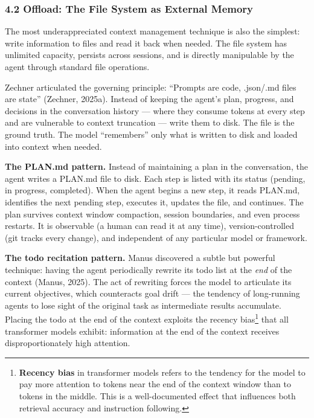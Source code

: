 \documentclass[11pt, a4paper]{article}
\begin{document}
\hypertarget{offload-the-file-system-as-external-memory}{%
\subsubsection{4.2 Offload: The File System as External
Memory}\label{offload-the-file-system-as-external-memory}}

The most underappreciated context management technique is also the
simplest: write information to files and read it back when needed. The
file system has unlimited capacity, persists across sessions, and is
directly manipulable by the agent through standard file operations.

Zechner articulated the governing principle: ``Prompts are code,
.json/.md files are state'' (Zechner, 2025a). Instead of keeping the
agent's plan, progress, and decisions in the conversation history ---
where they consume tokens at every step and are vulnerable to context
truncation --- write them to disk. The file is the ground truth. The
model ``remembers'' only what is written to disk and loaded into context
when needed.

\textbf{The PLAN.md pattern.} Instead of maintaining a plan in the
conversation, the agent writes a PLAN.md file to disk. Each step is
listed with its status (pending, in progress, completed). When the agent
begins a new step, it reads PLAN.md, identifies the next pending step,
executes it, updates the file, and continues. The plan survives context
window compaction, session boundaries, and even process restarts. It is
observable (a human can read it at any time), version-controlled (git
tracks every change), and independent of any particular model or
framework.

\textbf{The todo recitation pattern.} Manus discovered a subtle but
powerful technique: having the agent periodically rewrite its todo list
at the \emph{end} of the context (Manus, 2025). The act of rewriting
forces the model to articulate its current objectives, which counteracts
goal drift --- the tendency of long-running agents to lose sight of the
original task as intermediate results accumulate. Placing the todo at
the end of the context exploits the recency bias\footnote{\textbf{Recency
  bias} in transformer models refers to the tendency for the model to
  pay more attention to tokens near the end of the context window than
  to tokens in the middle. This is a well-documented effect that
  influences both retrieval accuracy and instruction following.} that
all transformer models exhibit: information at the end of the context
receives disproportionately high attention.
\end{document}
